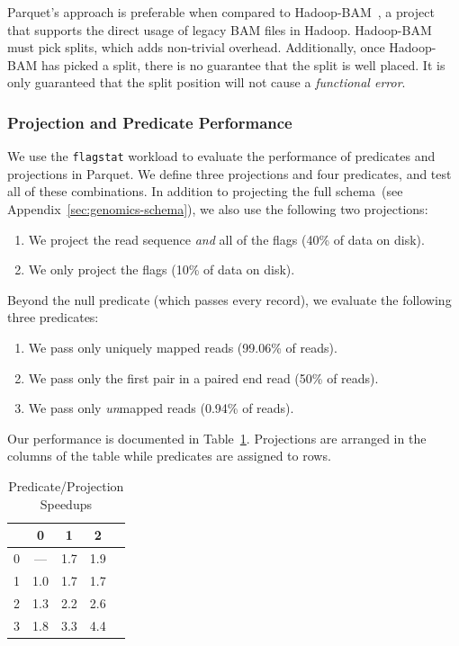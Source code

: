 \documentclass[10pt]{report} %
\begin{document}
Parquet's approach is preferable when compared to Hadoop-BAM~\cite{niemenmaa12}, a project that supports
the direct usage of legacy BAM files in Hadoop. Hadoop-BAM must pick splits, which adds non-trivial overhead.
Additionally, once Hadoop-BAM has picked a split, there is no guarantee that the split is well placed. It is only
guaranteed that the split position will not cause a \emph{functional error}.

\subsubsection{Projection and Predicate Performance}
\label{sec:projection-predicate-performance}

We use the \texttt{flagstat} workload to evaluate the performance of predicates and projections in Parquet.
We define three projections and four predicates, and test all of these combinations. In addition to projecting the
full schema~(see Appendix~\ref{sec:genomics-schema}), we also use the following two projections:

\begin{enumerate}
\item We project the read sequence \emph{and} all of the flags (40\% of data on disk).
\item We only project the flags (10\% of data on disk).
\end{enumerate}

Beyond the null predicate (which passes every record), we evaluate the following three predicates:

\begin{enumerate}
\item We pass only uniquely mapped reads (99.06\% of reads).
\item We pass only the first pair in a paired end read (50\% of reads).
\item We pass only \emph{un}mapped reads (0.94\% of reads).
\end{enumerate}

Our performance is documented in Table~\ref{tab:ppp}. Projections are arranged in the columns of the table
while predicates are assigned to rows.

\begin{table}[h]
\caption{Predicate/Projection Speedups}
\label{tab:ppp}
\begin{center}
\begin{tabular}{ l | c c c c }
\hline
& 0 & 1 & 2 \\
\hline
\hline
0 & --- & 1.7 & 1.9 \\
1 & 1.0 & 1.7 & 1.7 \\
2 & 1.3 & 2.2 & 2.6 \\
3 & 1.8 & 3.3 & 4.4 \\
\hline
\end{tabular}
\end{center}
\end{table}
\end{document}

